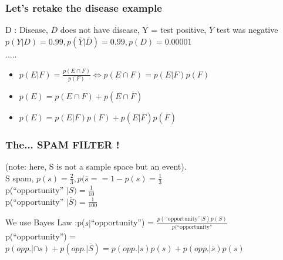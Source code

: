 \documentclass[12pt,a4paper]{article}
\begin{document}
\subsubsection{Let's retake the disease example}
D : Disease, $\overline{D}$ does not have disease, Y = test positive, $\overline{Y}$ test was negative\\
$p(Y|D)= 0.99, p(\overline{Y}|\overline{D}) = 0.99, p(D) = 0.00001$\\
.....\\
\begin{boite}
	\begin{itemize}
		\item $p(E|F) = \frac{p(E\cap F)}{p(F)} \iff p(E\cap F) = p(E|F)p(F)$
		\item $p(E) = p(E\cap F)+p(E\cap \overline{F})$
		\item $p(E) = p(E|F)p(F) + p(E|\overline{F})p(\overline{F})$
	\end{itemize}
\end{boite}

\subsubsection{The... SPAM FILTER !}
(note: here, S is not a sample space but an event).\\
S spam, $p(s) = \frac{2}{3}, p(\overline{s}= = 1 - p(s) = \frac{1}{3}$\\
p(``opportunity'' $| S) = \frac{1}{10}$\\
p(``opportunity'' $| \overline{S}) = \frac{1}{100}$

We use Bayes Law :p($s|$``opportunity'') = $\frac{p(\text{``opportunity''}|S)p(S)}{p(\text{``opportunity''}}$\\
p(``opportunity'') = $p(opp.|\cap s) + p(opp.| \overline{S}) = p(opp.|s)p(s) + p(opp.|\overline{s})p(s)$
\end{document}
